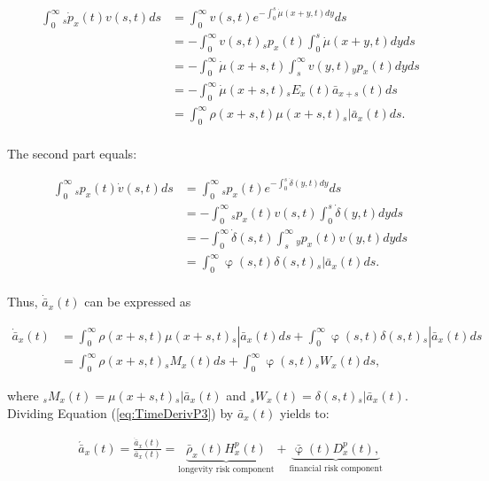 \documentclass[12pt]{article}
\begin{document}
\begin{equation}\label{eq:TimeDerivP1}
\begin{split}
\int_0^\infty {}_s\dot{p}_x(t) v(s,t)ds &= \int_0^\infty   v(s,t) e^{-\int_0^{s}\dot{\mu}(x+y,t)dy}ds\\
&= -\int_0^\infty   v(s,t) {}_sp_x(t)\int_0^{s}\dot{\mu}(x+y,t)dyds\\
&= -\int_0^\infty  \dot{\mu}(x+s,t) \int_s^{\infty} v(y,t) {}_yp_x(t) dyds\\
&= - \int_0^\infty \dot{\mu}(x+s,t)   {}_sE_x(t) \bar{a} _{x+s}(t) ds\\
&= \int_0^\infty \rho(x+s,t) \mu(x+s,t)   {}_s|\bar{a}_x(t) ds.\\
\end{split}
\end{equation}


The second part equals:

\begin{equation}\label{eq:TimeDerivP2}
\begin{split}
\int_0^\infty {}_sp_x(t) \dot{v}(s,t)ds &= \int_0^\infty {}_sp_x(t)  e^{-\int_0^{s}\dot{\delta}(y,t)dy}ds\\
&= -\int_0^\infty {}_sp_x(t) v(s,t) \int_0^{s}\dot{\delta}(y,t)dy ds\\
&= -\int_0^\infty  \dot{\delta}(s,t)\int_s^{\infty} {}_yp_x(t) v(y,t) dy ds\\
&= \int_0^\infty  \upvarphi(s,t) \delta(s,t)  {}_s|\bar{a}_x(t) ds.\\
\end{split}
\end{equation}


Thus, $\dot{\bar{a}} _x(t)$ can be expressed as


\begin{equation}\label{eq:TimeDerivP3}
\begin{split}
\dot{\bar{a}}_{x}(t) &=  \int_0^\infty \rho(x+s,t) \mu(x+s,t){}_s|\bar{a}_x(t) ds +\int_0^\infty  \upvarphi(s,t) \delta(s,t)  {}_s|\bar{a}_x(t) ds\\
&= \int_0^\infty \rho(x+s,t) {}_sM_x(t)  ds +\int_0^\infty  \upvarphi(s,t) {}_sW_x(t)  ds,
\end{split}
\end{equation}


where ${}_sM_x(t)= \mu(x+s,t){}_s|\bar{a}_x(t)$ and ${}_sW_x(t)=\delta(s,t)  {}_s|\bar{a}_x(t)$. Dividing Equation (\ref{eq:TimeDerivP3}) by $\bar{a}_x(t)$ yields to:


\begin{equation}\label{eq:TimeDerivP}
\begin{split}
 \acute{\bar{a}}_x(t) = \frac{\dot{\bar{a}}_x(t)}{\bar{a}_x(t)}  = 
 \underbrace{\bar{\rho}_x(t){H}^{p}_x(t)}_\text{longevity risk component}
 +\underbrace{\bar{\upvarphi}(t){D}^{p}_x(t),}_\text{financial risk component}
\end{split}
\end{equation}
\end{document}
